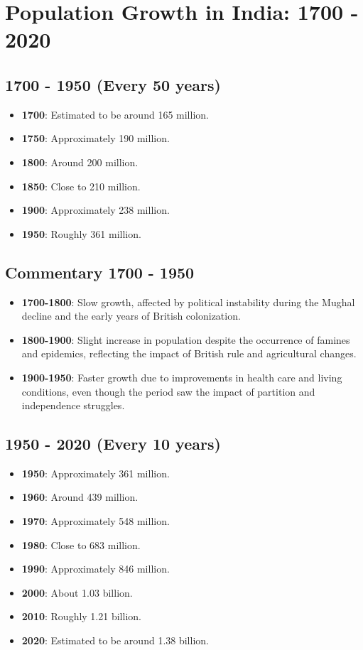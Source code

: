 \section*{Population Growth in India: 1700 - 2020}

\subsection*{1700 - 1950 (Every 50 years)}
\begin{itemize}
    \item \textbf{1700}: Estimated to be around 165 million.
    \item \textbf{1750}: Approximately 190 million.
    \item \textbf{1800}: Around 200 million.
    \item \textbf{1850}: Close to 210 million.
    \item \textbf{1900}: Approximately 238 million.
    \item \textbf{1950}: Roughly 361 million.
\end{itemize}

\subsection*{Commentary 1700 - 1950}
\begin{itemize}
    \item \textbf{1700-1800}: Slow growth, affected by political instability during the Mughal decline and the early years of British colonization.
    \item \textbf{1800-1900}: Slight increase in population despite the occurrence of famines and epidemics, reflecting the impact of British rule and agricultural changes.
    \item \textbf{1900-1950}: Faster growth due to improvements in health care and living conditions, even though the period saw the impact of partition and independence struggles.
\end{itemize}

\subsection*{1950 - 2020 (Every 10 years)}
\begin{itemize}
    \item \textbf{1950}: Approximately 361 million.
    \item \textbf{1960}: Around 439 million.
    \item \textbf{1970}: Approximately 548 million.
    \item \textbf{1980}: Close to 683 million.
    \item \textbf{1990}: Approximately 846 million.
    \item \textbf{2000}: About 1.03 billion.
    \item \textbf{2010}: Roughly 1.21 billion.
    \item \textbf{2020}: Estimated to be around 1.38 billion.
\end{itemize}

